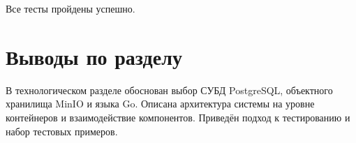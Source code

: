 Все тесты пройдены успешно.


\section*{Выводы по разделу}

В технологическом разделе обоснован выбор СУБД PostgreSQL, объектного хранилища MinIO и языка Go.
Описана архитектура системы на уровне контейнеров и взаимодействие компонентов.
Приведён подход к тестированию и набор тестовых примеров.
